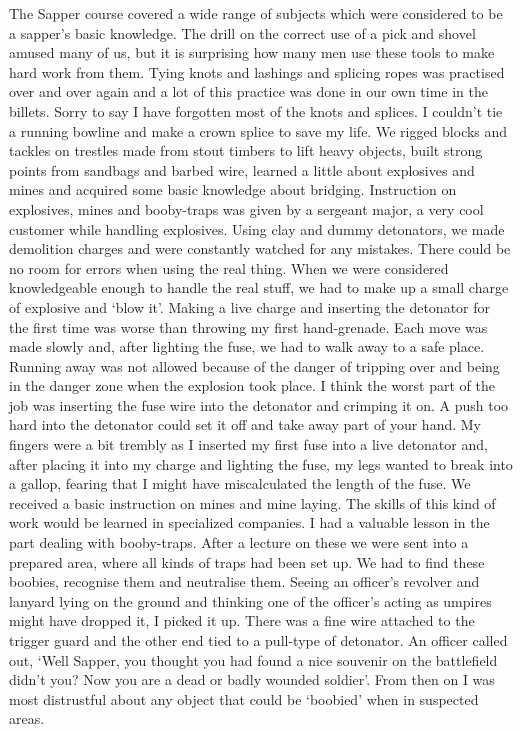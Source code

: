 The Sapper course covered a wide range of subjects which were
considered to be a sapper's basic knowledge. The drill on the correct
use of a pick and shovel amused many of us, but it is surprising how
many men use these tools to make hard work from them. Tying knots and
lashings and splicing ropes was practised over and over again and a
lot of this practice was done in our own time in the billets. Sorry
to say I have forgotten most of the knots and splices. I couldn't tie
a running bowline and make a crown splice to save my life. We rigged
blocks and tackles on trestles made from stout timbers to lift heavy
objects, built strong points from sandbags and barbed wire, learned a
little about explosives and mines and acquired some basic knowledge
about bridging. Instruction on explosives, mines and booby-traps was
given by a sergeant major, a very cool customer while handling
explosives. Using clay and dummy detonators, we made demolition
charges and were constantly watched for any mistakes. There could be
no room for errors when using the real thing. When we were considered
knowledgeable enough to handle the real stuff, we had to make up a
small charge of explosive and `blow it'. Making a live charge and
inserting the detonator for the first time was worse than throwing my
first hand-grenade. Each move was made slowly and, after lighting the
fuse, we had to walk away to a safe place. Running away was not
allowed because of the danger of tripping over and being in the danger
zone when the explosion took place. I think the worst part of the job
was inserting the fuse wire into the detonator and crimping it on. A
push too hard into the detonator could set it off and take away part
of your hand. My fingers were a bit trembly as I inserted my first
fuse into a live detonator and, after placing it into my charge and
lighting the fuse, my legs wanted to break into a gallop, fearing that
I might have miscalculated the length of the fuse. We received a
basic instruction on mines and mine laying. The skills of this kind
of work would be learned in specialized companies. I had a valuable
lesson in the part dealing with booby-traps. After a lecture on these
we were sent into a prepared area, where all kinds of traps had been
set up. We had to find these boobies, recognise them and neutralise them.
Seeing an officer's revolver and lanyard lying on the ground and
thinking one of the officer's acting as umpires might have dropped it,
I picked it up. There was a fine wire attached to the trigger guard
and the other end tied to a pull-type of detonator. An officer called
out, `Well Sapper, you thought you had found a nice souvenir on the
battlefield didn't you?  Now you are a dead or badly wounded soldier'.
From then on I was most distrustful about any object that could be
`boobied' when in suspected areas. 

